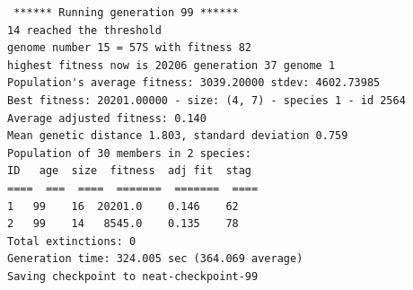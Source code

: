 \begin{listing}[H]
\begin{verbatim}
 ****** Running generation 99 ****** 
14 reached the threshold
genome number 15 = 57S with fitness 82
highest fitness now is 20206 generation 37 genome 1
Population's average fitness: 3039.20000 stdev: 4602.73985
Best fitness: 20201.00000 - size: (4, 7) - species 1 - id 2564
Average adjusted fitness: 0.140
Mean genetic distance 1.803, standard deviation 0.759
Population of 30 members in 2 species:
ID   age  size  fitness  adj fit  stag
====  ===  ====  =======  =======  ====
1   99    16  20201.0    0.146    62
2   99    14   8545.0    0.135    78
Total extinctions: 0
Generation time: 324.005 sec (364.069 average)
Saving checkpoint to neat-checkpoint-99
\end{verbatim}
\end{listing}

 
 
 
 
 
 
 
 
 
 
 
